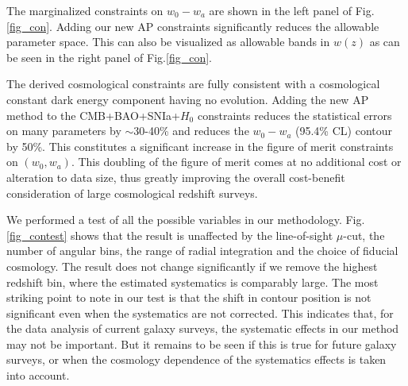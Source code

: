 \documentclass[iop]{emulateapj}
\begin{document}
The marginalized constraints on $w_0-w_a$ are shown in the left panel of Fig.\ref{fig_con}.
Adding our new AP constraints significantly reduces the allowable parameter space. 
This can also be visualized as allowable bands in $w(z)$ as can be seen in the right panel of Fig.\ref{fig_con}.  

The derived cosmological constraints are fully consistent with a cosmological constant dark energy component having no evolution.
Adding the new AP method to the CMB+BAO+SNIa+$H_0$ constraints reduces the statistical errors on many parameters by $\sim$30-40\% 
and reduces the $w_0-w_a$ (95.4\% CL) contour by 50\%.
This constitutes a significant increase in the figure of merit constraints on $(w_0, w_a)$. 
This doubling of the figure of merit comes at no additional cost or alteration to data size, 
thus greatly improving the overall cost-benefit consideration of large cosmological redshift surveys.


We performed a test of all the possible variables in our methodology.
Fig.\ref{fig_contest} shows that 
the result is unaffected by the line-of-sight $\mu$-cut, 
the number of angular bins, 
the range of radial integration and the choice of fiducial cosmology. 
The result does not change significantly if we remove the highest redshift bin,
where the estimated systematics is comparably large.
The most striking point to note in our test is that the 
shift in contour position is not significant even when %
the systematics are not corrected.
This indicates that, for the data analysis of current galaxy surveys,
the systematic effects in our method may not be important.
But it remains to be seen if this is true for future galaxy surveys,
or when the cosmology dependence of the systematics effects is taken into account.


\end{document}
